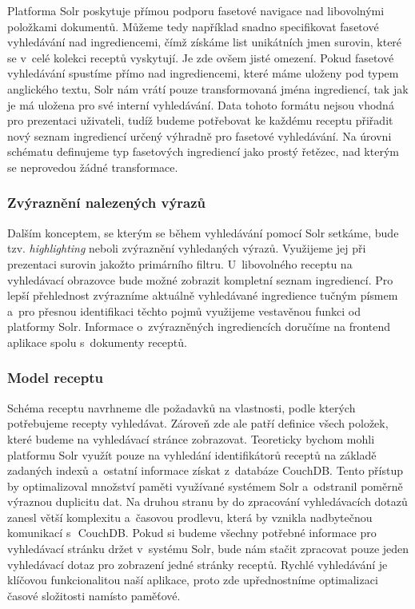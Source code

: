 Platforma Solr poskytuje přímou podporu fasetové navigace nad libovolnými položkami dokumentů. Můžeme tedy například snadno specifikovat fasetové vyhledávání nad ingrediencemi, čímž získáme list unikátních jmen surovin, které se v~celé kolekci receptů vyskytují. Je zde ovšem jisté omezení. Pokud fasetové vyhledávání spustíme přímo nad ingrediencemi, které máme uloženy pod typem anglického textu, Solr nám vrátí pouze transformovaná jména ingrediencí, tak jak je má uložena pro své interní vyhledávání. Data tohoto formátu nejsou vhodná pro prezentaci uživateli, tudíž budeme potřebovat ke každému receptu přiřadit nový seznam ingrediencí určený výhradně pro fasetové vyhledávání. Na úrovni schématu definujeme typ fasetových ingrediencí jako prostý řetězec, nad kterým se neprovedou žádné transformace.

\subsubsection{Zvýraznění nalezených výrazů}

Dalším konceptem, se kterým se během vyhledávání pomocí Solr setkáme, bude tzv. \emph{highlighting} neboli zvýraznění vyhledaných výrazů. Využijeme jej při prezentaci surovin jakožto primárního filtru. U~libovolného receptu na vyhledávací obrazovce bude možné zobrazit kompletní seznam ingrediencí. Pro lepší přehlednost zvýrazníme aktuálně vyhledávané ingredience tučným písmem a~pro přesnou identifikaci těchto pojmů využijeme vestavěnou funkci od platformy Solr. Informace o~zvýrazněných ingrediencích doručíme na frontend aplikace spolu s~dokumenty receptů.

\subsubsection{Model receptu}

Schéma receptu navrhneme dle požadavků na vlastnosti, podle kterých potřebujeme recepty vyhledávat. Zároveň zde ale patří definice všech položek, které budeme na vyhledávací stránce zobrazovat. Teoreticky bychom mohli platformu Solr využít pouze na vyhledání identifikátorů receptů na základě zadaných indexů a~ostatní informace získat z~databáze CouchDB. Tento přístup by optimalizoval množství paměti využívané systémem Solr a~odstranil poměrně výraznou duplicitu dat. Na druhou stranu by do zpracování vyhledávacích dotazů zanesl větší komplexitu a~časovou prodlevu, která by vznikla nadbytečnou komunikací s~\,CouchDB. Pokud si budeme všechny potřebné informace pro vyhledávací stránku držet v~systému Solr, bude nám stačit zpracovat pouze jeden vyhledávací dotaz pro zobrazení jedné stránky receptů. Rychlé vyhledávání je klíčovou funkcionalitou naší aplikace, proto zde upřednostníme optimalizaci časové složitosti namísto paměťové.

